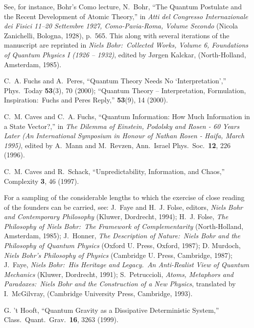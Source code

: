 \documentclass[12pt,aps,eqsecnum]{revtex4-1}
\begin{document}
%
%

\begin{thebibliography}{10}

See, for instance, Bohr's Como lecture, N.~Bohr, ``The Quantum
Postulate and the Recent Development of Atomic Theory,'' in {\sl
Atti del Congresso Internazionale dei Fisici 11--20 Settembre 1927,
Como-Pavia-Roma, Volume Secondo} (Nicola Zanichelli, Bologna,
1928), p.~565.  This along with several iterations of the manuscript
are reprinted in {\sl Niels Bohr:\ Collected Works, Volume 6,
Foundations of Quantum Physics I (1926 -- 1932)}, edited by
J{\o}rgen Kalckar, (North-Holland, Amsterdam, 1985).

C.~A. Fuchs and A.~Peres, ``Quantum Theory Needs No
`Interpretation','' Phys.\ Today {\bf 53}(3), 70 (2000); ``Quantum
Theory -- Interpretation, Formulation, Inspiration:\ Fuchs and Peres
Reply,'' {\bf 53}(9), 14 (2000).

C.~M. Caves and C.~A. Fuchs, ``Quantum Information: How Much
Information in a State Vector?,'' in {\sl The Dilemma of Einstein,
Podolsky and Rosen - 60 Years Later (An International Symposium in
Honour of Nathan Rosen - Haifa, March 1995)}, edited by A.~Mann and
M.~Revzen, Ann.\ Israel Phys.\ Soc.\ {\bf 12}, 226 (1996).

C.~M. Caves and R.~Schack, ``Unpredictability, Information, and
Chaos,'' Complexity {\bf 3}, 46 (1997).

For a sampling of the considerable lengths to which the exercise
of close reading of the founders can be carried, see: J.~Faye and
H.~J. Folse, editors, {\sl Niels Bohr and Contemporary
Philosophy\/} (Kluwer, Dordrecht, 1994); H.~J. Folse, {\sl The
Philosophy of Niels Bohr:~The Framework of Complementarity\/}
(North-Holland, Amsterdam, 1985); J.~Honner, {\sl The Description
of Nature:\ Niels Bohr and the Philosophy of Quantum Physics\/}
(Oxford U. Press, Oxford, 1987); D. Murdoch, {\sl Niels Bohr's
Philosophy of Physics\/} (Cambridge U. Press, Cambridge, 1987);
J.~Faye, {\sl Niels Bohr:\ His Heritage and Legacy.\ An
Anti-Realist View of Quantum Mechanics\/} (Kluwer, Dordrecht,
1991); S.~Petruccioli, {\sl Atoms, Metaphors and Paradoxes:\ Niels
Bohr and the Construction of a New Physics}, translated by
I.~McGilvray, (Cambridge University Press, Cambridge, 1993).

G. 't Hooft, ``Quantum Gravity as a Dissipative Deterministic
System,'' Class.\ Quant.\ Grav.\ {\bf 16}, 3263 (1999).


\end{thebibliography}
\end{document}
